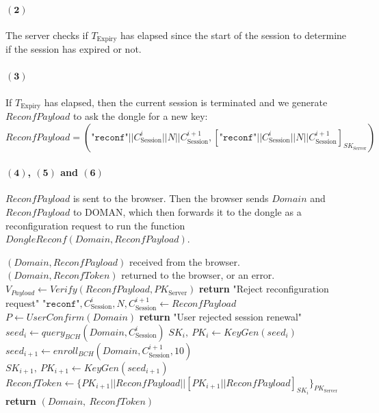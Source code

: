 \paragraph{$\boldsymbol{(2)}$} The server checks if $T_\text{Expiry}$ has elapsed since the start of the session to determine if the session has expired or not.
\paragraph{$\boldsymbol{(3)}$} If $T_\text{Expiry}$ has elapsed, then the current session is terminated and we generate $ReconfPayload$ to ask the dongle for a new key:
$$ReconfPayload = (\texttt{"reconf"} || C^i_{\text{Session}} || N || C^{i+1}_{\text{Session}}, [\texttt{"reconf"} || C^i_{\text{Session}} || N || C^{i+1}_{\text{Session}}]_{SK_\text{Server}})$$
\paragraph{$\boldsymbol{(4)}$, $\boldsymbol{(5)}$ and $\boldsymbol{(6)}$} $ReconfPayload$ is sent to the browser. Then the browser sends $Domain$ and $ReconfPayload$ to DOMAN, which then forwards it to the dongle as a reconfiguration request to run the function $DongleReconf(Domain, ReconfPayload)$.
\begin{algorithm}[ht!]
\caption{$DongleReconf(Domain, ReconfPayload)$}
\begin{algorithmic}[1]
    \Require $(Domain, ReconfPayload)$ received from the browser.
    \Ensure  $(Domain, ReconfToken)$ returned to the browser, or an error.
    \State $V_{Payload} \leftarrow Verify(ReconfPayload, PK_{\text{Server}})$
        \State \textbf{return} "Reject reconfiguration request"
    \EndIf
    \State $\texttt{"reconf"}, C^i_{\text{Session}}, N, C^{i+1}_{\text{Session}} \leftarrow ReconfPayload$
    \State $P \leftarrow UserConfirm(Domain)$
        \State \textbf{return} "User rejected session renewal"
    \EndIf
    \State $seed_i \leftarrow query_{BCH}(Domain, C_\text{Session}^i)$
    \State $SK_i,\ PK_i \leftarrow KeyGen(seed_i)$
    \State $seed_{i+1} \leftarrow enroll_{BCH}(Domain, C^{i+1}_{\text{Session}},10)$
    \State $SK_{i+1},\ PK_{i+1} \leftarrow KeyGen(seed_{i+1})$
    \State $ReconfToken \leftarrow \{PK_{i+1} || ReconfPayload || [PK_{i+1} || ReconfPayload]_{SK_i}\}_{PK_{\text{Server}}}$
    \State \textbf{return} $(Domain,\ ReconfToken)$
\end{algorithmic}
\label{alg:dongle-reconf}
\end{algorithm}
